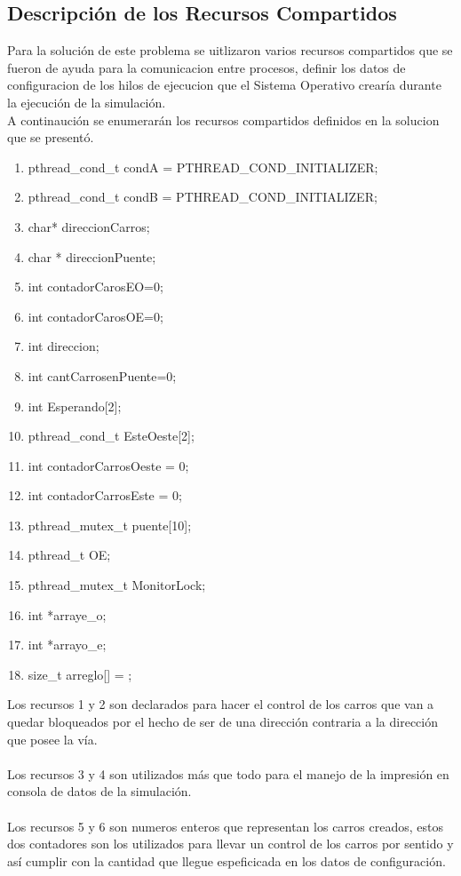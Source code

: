 \documentclass[10pt,a4paper]{article}
\begin{document}
\subsection{Descripción de los Recursos Compartidos}
	Para la solución de este problema se uitlizaron varios recursos compartidos que se fueron de ayuda para la comunicacion entre procesos, definir los datos de configuracion de los hilos de ejecucion que el Sistema Operativo crearía durante la ejecución de la simulación.\\
A continaución se enumerarán los recursos compartidos definidos en la solucion que se presentó.\\
\begin{enumerate}
\item pthread\_cond\_t      condA  = PTHREAD\_COND\_INITIALIZER; 
\item pthread\_cond\_t      condB  = PTHREAD\_COND\_INITIALIZER;
\item char* direccionCarros;
\item char * direccionPuente;
\item int contadorCarosEO=0;
\item int contadorCarosOE=0;
\item int direccion; 
\item int cantCarrosenPuente=0;
\item int Esperando[2];
\item pthread\_cond\_t EsteOeste[2];
\item int contadorCarrosOeste = 0;
\item int contadorCarrosEste = 0;
\item pthread\_mutex\_t puente[10];
\item pthread\_t OE;
\item pthread\_mutex\_t MonitorLock;
\item int *arraye\_o;
\item int *arrayo\_e;
\item size\_t arreglo[] = {};
\end{enumerate}
Los recursos 1 y 2 son declarados para hacer el control de los carros que van a quedar bloqueados por el hecho de ser de una dirección contraria a la dirección que posee la vía.\\\\
Los recursos 3 y 4 son utilizados más que todo para el manejo de la impresión en consola de datos de la simulación.\\\\
Los recursos 5 y 6 son numeros enteros que representan los carros creados, estos dos contadores son los utilizados para llevar un control de los carros por sentido y así cumplir con la cantidad que llegue espeficicada en los datos de configuración.\\\\
\end{document}

